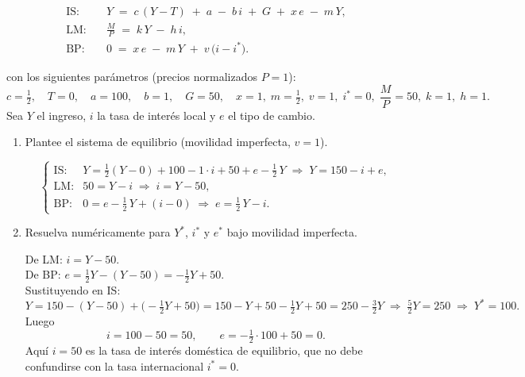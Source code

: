 \documentclass[a4paper]{article}
\begin{document}
\begin{align*}
\text{IS:}\quad &Y \;=\; c\,(Y - T)\;+\;a \;-\;b\,i\;+\;G\;+\;x\,e\;-\;m\,Y,\\[6pt]
\text{LM:}\quad &\frac{M}{P}\;=\;k\,Y\;-\;h\,i,\\[6pt]
\text{BP:}\quad &0\;=\;x\,e\;-\;m\,Y\;+\;v\,\bigl(i - i^*\bigr).
\end{align*}

con los siguientes parámetros (precios normalizados \(P=1\)):
\[
c = \tfrac12,\quad T=0,\quad a=100,\quad b=1,\quad G=50,\quad
x=1,\;m=\tfrac12,\;v=1,\;i^*=0,\;
\frac{M}{P}=50,\;k=1,\;h=1.
\]
Sea \(Y\) el ingreso, \(i\) la tasa de interés local y \(e\) el tipo de cambio.

\begin{enumerate}
  \item[a)] Plantee el sistema de equilibrio (movilidad imperfecta, \(v=1\)).
  \begin{solution}
  \[
  \begin{cases}
  \text{IS:}&
  Y = \tfrac12(Y - 0) + 100 - 1\cdot i + 50 + e - \tfrac12\,Y
  \;\Longrightarrow\;
  Y = 150 - i + e,\\[6pt]
  \text{LM:}&
  50 = Y - i
  \;\Longrightarrow\;
  i = Y - 50,\\[6pt]
  \text{BP:}&
  0 = e - \tfrac12\,Y + (i - 0)
  \;\Longrightarrow\;
  e = \tfrac12\,Y - i.
  \end{cases}
  \]
  \end{solution}

  \item[b)] Resuelva numéricamente para \(Y^*\), \(i^*\) y \(e^*\) bajo movilidad imperfecta.
  \begin{solution}
  De LM: \(i = Y - 50\).\\
  De BP: \(e = \tfrac12Y - (Y - 50) = -\tfrac12Y + 50\).\\
  Sustituyendo en IS:
  \[
  Y = 150 - (Y-50) + \bigl(-\tfrac12Y + 50\bigr)
    = 150 - Y + 50 - \tfrac12Y + 50
    = 250 - \tfrac32Y
    \;\Longrightarrow\;
    \tfrac52Y = 250
    \;\Longrightarrow\;
    Y^* = 100.
  \]
  Luego
  \[
    i = 100 - 50 = 50,
    \qquad
    e = -\tfrac12\cdot100 + 50 = 0.
  \]
  Aquí \(i = 50\) es la tasa de interés doméstica de equilibrio, que no debe confundirse con la tasa internacional \(i^* = 0\).
  \end{solution}


\end{enumerate}
\end{document}
